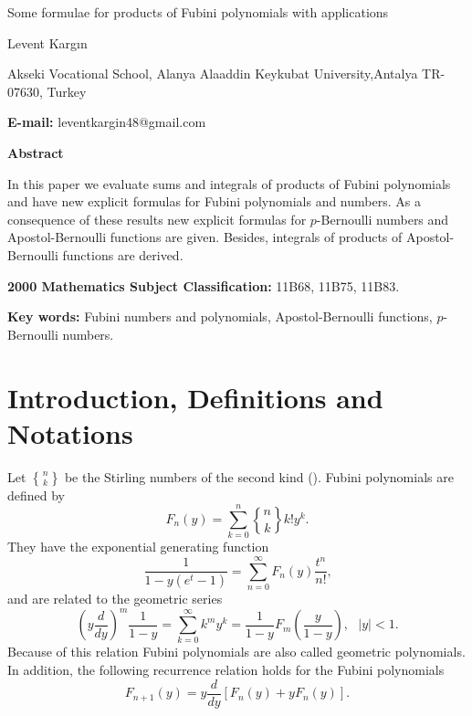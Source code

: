\documentclass{article}%
\begin{document}
\title{ }

\begin{center}
{\Large Some formulae for products of Fubini polynomials with applications}%
\bigskip

Levent Karg\i n

Akseki Vocational School, Alanya Alaaddin Keykubat University,\newline Antalya
TR-07630, Turkey\newline

\textbf{E-mail: }leventkargin48@gmail.com\bigskip

\textbf{Abstract}
\end{center}

In this paper we evaluate sums and integrals of products of Fubini polynomials
and have new explicit formulas for Fubini polynomials and numbers. As a
consequence of these results new explicit formulas for $p$-Bernoulli numbers
and Apostol-Bernoulli functions are given. Besides, integrals of products of
Apostol-Bernoulli functions are derived.

\textbf{2000 Mathematics Subject Classification: }11B68, 11B75, 11B83.

\textbf{Key words: }Fubini numbers and polynomials, Apostol-Bernoulli
functions, $p$-Bernoulli numbers.

\section{Introduction, Definitions and Notations}

Let $%
\genfrac{\{}{\}}{0pt}{}{n}{k}%
$ be the Stirling numbers of the second kind (\cite{Graham}). Fubini
polynomials are defined by \cite{T}
\begin{equation}
F_{n}\left(  y\right)  =\sum_{k=0}^{n}%
\genfrac{\{}{\}}{0pt}{}{n}{k}%
k!y^{k}. \label{2}%
\end{equation}
They have the exponential generating function
\begin{equation}
\frac{1}{1-y\left(  e^{t}-1\right)  }=\sum_{n=0}^{\infty}F_{n}\left(
y\right)  \frac{t^{n}}{n!}\text{,} \label{10}%
\end{equation}
and are related to the geometric series \cite{B}%
\[
\left(  y\frac{d}{dy}\right)  ^{m}\frac{1}{1-y}=\sum_{k=0}^{\infty}k^{m}%
y^{k}=\frac{1}{1-y}F_{m}\left(  \frac{y}{1-y}\right)  ,\text{ \ }\left\vert
y\right\vert <1.
\]
Because of this relation Fubini polynomials are also called geometric
polynomials. In addition, the following recurrence relation holds for the
Fubini polynomials \cite{Diletal}%
\begin{equation}
F_{n+1}\left(  y\right)  =y\frac{d}{dy}\left[  F_{n}\left(  y\right)
+yF_{n}\left(  y\right)  \right]  . \label{11}%
\end{equation}
\end{document}
